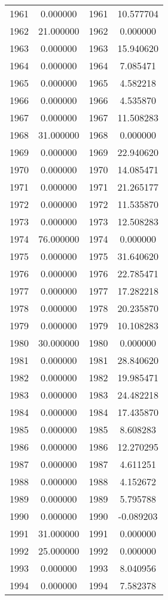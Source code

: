 \documentclass[12pt]{article}
\begin{document}
\begin{longtable}{@{}cccc@{}}
1961 & 0.000000 & 1961 & 10.577704 \\
1962 & 21.000000 & 1962 & 0.000000 \\
1963 & 0.000000 & 1963 & 15.940620 \\
1964 & 0.000000 & 1964 & 7.085471 \\
1965 & 0.000000 & 1965 & 4.582218 \\
1966 & 0.000000 & 1966 & 4.535870 \\
1967 & 0.000000 & 1967 & 11.508283 \\
1968 & 31.000000 & 1968 & 0.000000 \\
1969 & 0.000000 & 1969 & 22.940620 \\
1970 & 0.000000 & 1970 & 14.085471 \\
1971 & 0.000000 & 1971 & 21.265177 \\
1972 & 0.000000 & 1972 & 11.535870 \\
1973 & 0.000000 & 1973 & 12.508283 \\
1974 & 76.000000 & 1974 & 0.000000 \\
1975 & 0.000000 & 1975 & 31.640620 \\
1976 & 0.000000 & 1976 & 22.785471 \\
1977 & 0.000000 & 1977 & 17.282218 \\
1978 & 0.000000 & 1978 & 20.235870 \\
1979 & 0.000000 & 1979 & 10.108283 \\
1980 & 30.000000 & 1980 & 0.000000 \\
1981 & 0.000000 & 1981 & 28.840620 \\
1982 & 0.000000 & 1982 & 19.985471 \\
1983 & 0.000000 & 1983 & 24.482218 \\
1984 & 0.000000 & 1984 & 17.435870 \\
1985 & 0.000000 & 1985 & 8.608283 \\
1986 & 0.000000 & 1986 & 12.270295 \\
1987 & 0.000000 & 1987 & 4.611251 \\
1988 & 0.000000 & 1988 & 4.152672 \\
1989 & 0.000000 & 1989 & 5.795788 \\
1990 & 0.000000 & 1990 & -0.089203 \\
1991 & 31.000000 & 1991 & 0.000000 \\
1992 & 25.000000 & 1992 & 0.000000 \\
1993 & 0.000000 & 1993 & 8.040956 \\
1994 & 0.000000 & 1994 & 7.582378 \\

\end{longtable}
\end{document}
